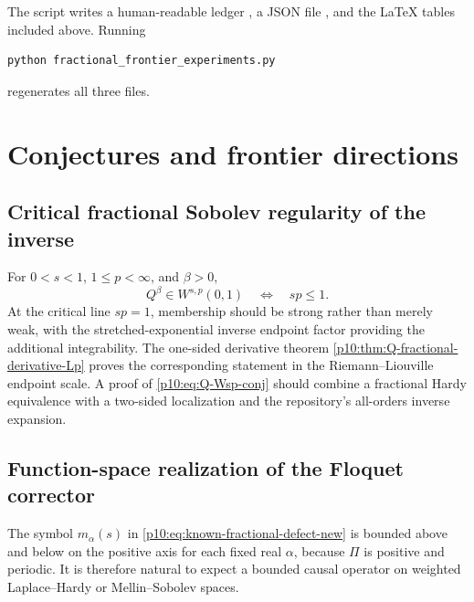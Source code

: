 \documentclass[11pt,oneside]{article}
\theoremstyle{definition}
\theoremstyle{remark}
\newcommand{\Q}{Q}
\newcommand{\1}{\mathbf 1}
\begin{document}
The script writes a human-readable ledger , a JSON file
, and the LaTeX tables included above.  Running
\begin{verbatim}
python fractional_frontier_experiments.py
\end{verbatim}
regenerates all three files.


\section{Conjectures and frontier directions}

\subsection{Critical fractional Sobolev regularity of the inverse}

\begin{conjecture}\label{p10:conj:Q-Wsp}
For \(0<s<1\), \(1\le p<\infty\), and \(\beta>0\),
\begin{equation}\label{p10:eq:Q-Wsp-conj}
 \Q^\beta\in W^{s,p}(0,1)
 \quad\Longleftrightarrow\quad sp\le1.
\end{equation}
At the critical line \(sp=1\), membership should be strong rather than merely weak,
with the stretched-exponential inverse endpoint factor providing the additional
integrability.  The one-sided derivative theorem
\cref{p10:thm:Q-fractional-derivative-Lp} proves the corresponding statement in the
Riemann--Liouville endpoint scale.  A proof of \eqref{p10:eq:Q-Wsp-conj} should combine a
fractional Hardy equivalence with a two-sided localization and the repository's
all-orders inverse expansion.
\end{conjecture}

\subsection{Function-space realization of the Floquet corrector}

The symbol \(m_\alpha(s)\) in \eqref{p10:eq:known-fractional-defect-new} is bounded above
and below on the positive axis for each fixed real \(\alpha\), because \(\Pi\) is
positive and periodic.  It is therefore natural to expect a bounded causal operator on
weighted Laplace--Hardy or Mellin--Sobolev spaces.
\end{document}

